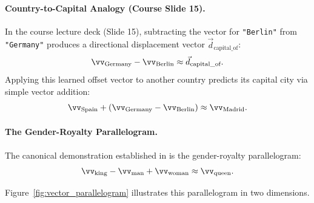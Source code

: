 \documentclass[../../main.tex]{subfiles}
\begin{document}
\paragraph{Country-to-Capital Analogy (Course Slide 15).}
In the course lecture deck (Slide 15), subtracting the vector for \texttt{"Berlin"} from \texttt{"Germany"} produces a directional displacement vector $\vec{d}_{\text{capital\_of}}$:
\begin{equation}
\label{eq:rel_germany_berlin}
\vv_{\text{Germany}} - \vv_{\text{Berlin}} \approx \vec{d}_{\text{capital\_of}}.
\end{equation}
Applying this learned offset vector to another country predicts its capital city via simple vector addition:
\begin{equation}
\label{eq:rel_spain_madrid}
\vv_{\text{Spain}} + (\vv_{\text{Germany}} - \vv_{\text{Berlin}}) \approx \vv_{\text{Madrid}}.
\end{equation}

\paragraph{The Gender-Royalty Parallelogram.}
The canonical demonstration established in \cite{mikolov2013distributed} is the gender-royalty parallelogram:
\begin{equation}
\label{eq:king_queen_arithmetic}
\vv_{\text{king}} - \vv_{\text{man}} + \vv_{\text{woman}} \approx \vv_{\text{queen}}.
\end{equation}

Figure~\ref{fig:vector_parallelogram} illustrates this parallelogram in two dimensions.
\end{document}
